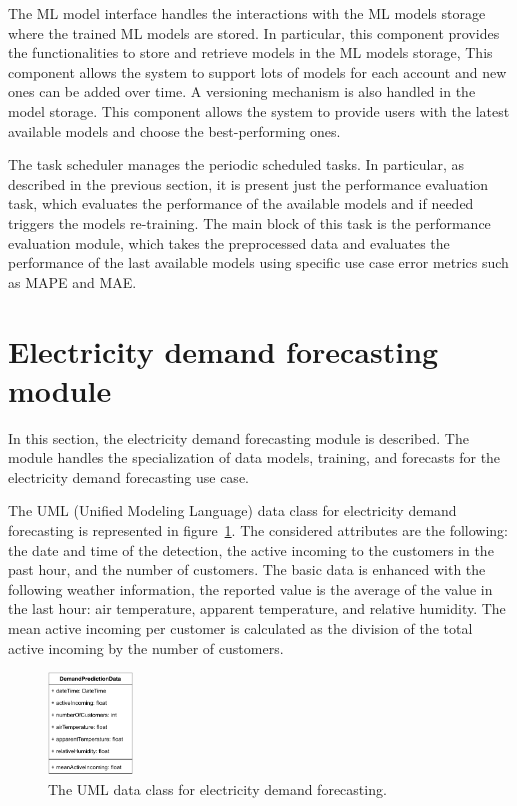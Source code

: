 The ML model interface handles the interactions with the ML models storage where the trained ML models are stored.
In particular, this component provides the functionalities to store and retrieve models in the ML models storage,
This component allows the system to support lots of models for each account and new ones can be added over time.
A versioning mechanism is also handled in the model storage.
This component allows the system to provide users with the latest available models and choose the best-performing ones.

The task scheduler manages the periodic scheduled tasks.
In particular, as described in the previous section, it is present just the performance evaluation task, which evaluates the performance of the available models and if needed triggers the models re-training.
The main block of this task is the performance evaluation module, which takes the preprocessed data and evaluates the performance of the last available models using specific use case error metrics such as MAPE and MAE.


\section{Electricity demand forecasting module}
\label{sec:demandmodel}
\vspace{0.2 cm}

In this section, the electricity demand forecasting module is described.
The module handles the specialization of data models, training, and forecasts for the electricity demand forecasting use case.

The UML (Unified Modeling Language) data class for electricity demand forecasting is represented in figure~\ref{fig:umldemand}.
The considered attributes are the following: the date and time of the detection, the active incoming to the customers in the past hour, and the number of customers.
The basic data is enhanced with the following weather information, the reported value is the average of the value in the last hour: air temperature, apparent temperature, and relative humidity.
The mean active incoming per customer is calculated as the division of the total active incoming by the number of customers.

\begin{figure}[H]
\centering
\includegraphics[width=0.20\textwidth]{images/demand_prediction_uml}
\caption{The UML data class for electricity demand forecasting.}
\label{fig:umldemand}
\end{figure}

